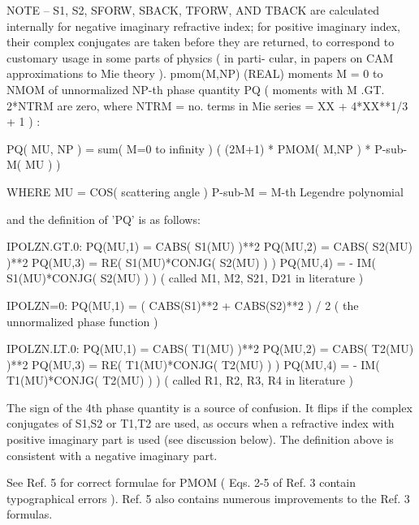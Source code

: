 \begin{DoxyVerb}
               NOTE -- S1, S2, SFORW, SBACK, TFORW, AND TBACK are calculated
               internally for negative imaginary refractive index;
               for positive imaginary index, their complex conjugates
               are taken before they are returned, to correspond to
               customary usage in some parts of physics ( in parti-
               cular, in papers on CAM approximations to Mie theory ).
    pmom(M,NP) (REAL) moments  M = 0 to NMOM  of unnormalized NP-th
               phase quantity PQ  ( moments with  M .GT. 2*NTRM  are
               zero, where  NTRM = no. terms in Mie series =
               XX + 4*XX**1/3 + 1 ) :

               PQ( MU, NP ) = sum( M=0 to infinity ) ( (2M+1)
                            * PMOM( M,NP ) * P-sub-M( MU ) )

               WHERE  MU = COS( scattering angle )
               P-sub-M = M-th Legendre polynomial

               and the definition of 'PQ' is as follows:

               IPOLZN.GT.0:  PQ(MU,1) = CABS( S1(MU) )**2
                      PQ(MU,2) = CABS( S2(MU) )**2
                      PQ(MU,3) = RE( S1(MU)*CONJG( S2(MU) ) )
                      PQ(MU,4) = - IM( S1(MU)*CONJG( S2(MU) ) )
                      ( called M1, M2, S21, D21 in literature )

               IPOLZN=0:  PQ(MU,1) = ( CABS(S1)**2 + CABS(S2)**2 ) / 2
                   ( the unnormalized phase function )

               IPOLZN.LT.0:  PQ(MU,1) = CABS( T1(MU) )**2
                      PQ(MU,2) = CABS( T2(MU) )**2
                      PQ(MU,3) = RE( T1(MU)*CONJG( T2(MU) ) )
                      PQ(MU,4) = - IM( T1(MU)*CONJG( T2(MU) ) )
                      ( called R1, R2, R3, R4 in literature )

               The sign of the 4th phase quantity is a source of
               confusion.  It flips if the complex conjugates of
               S1,S2  or  T1,T2  are used, as occurs when a
               refractive index with positive imaginary part is
               used (see discussion below).  The definition above
               is consistent with a negative imaginary part.

               See Ref. 5 for correct formulae for PMOM ( Eqs. 2-5
               of Ref. 3 contain typographical errors ).  Ref. 5 also
               contains numerous improvements to the Ref. 3 formulas.


\end{DoxyVerb}
